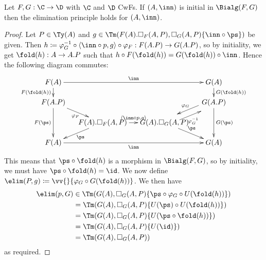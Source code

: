 \documentclass{article}
\begin{document}
\begin{theorem}
  Let $F, G : \C \to \D$ with $\C$ and $\D$ CwFs. If $(A, \inn)$ is
  initial in $\Bialg(F, G)$ then the elimination principle holds for
  $(A, \inn)$.
\end{theorem}
\begin{proof}
  Let $P \in \Ty(A)$ and $g \in \Tm(F(A).\square_F(A, P), \square_G(A,
  P)\{\inn \circ \ps\})$ be given. Then $h \coloneqq \varphi_G^{-1}
  \circ \langle \inn \circ p, g\rangle \circ \varphi_F : F(A.P) \to
  G(A.P)$, so by initiality, we get $\fold(h) : A \to A.P$ such that
  $h \circ F(\fold(h)) = G(\fold(h)) \circ \inn$. Hence the following
  diagram commutes:
\[
\xymatrix@-1pc{
F(A) \ar^-{\inn}[rrr] \ar_-{F(\fold(h))}[d] & & & G(A) \ar^-{G(\fold(h))}[d] \\
F(A.P) \ar_{\varphi_F}[dr] \ar_-{F(\ps)}[dd] & & & G(A.P) \ar@<-1ex>_-{\varphi_G}[dl] \ar^-{G(\ps)}[dd]\\
 & F(A).\square_F(A,P) \ar^{\langle \inn \circ p, g\rangle}[r] \ar^{\ps}[dl]& G(A).\square_G(A,P) \ar@<-1ex>_-{\varphi_G^{-1}}[ur] \ar^{\ps}[dr] & \\
F(A) \ar_-{\inn}[rrr] & & & G(A)
}
\]
This means that $\ps \circ \fold(h)$ is a morphism in $\Bialg(F, G)$,
so by initiality, we must have $\ps \circ \fold(h) = \id$. We now
define $\elim(P, g) \coloneqq \vv{}\{\varphi_G \circ G(\fold(h))\}$.
We then have
\begin{align*}
  \elim(p, G) &\in \Tm(G(A), \square_G(A, P)\{ \ps \circ \varphi_G \circ U(\fold(h))\}) \\
              &=  \Tm(G(A), \square_G(A, P)\{ U(\ps) \circ U(\fold(h))\}) \\
              &=  \Tm(G(A), \square_G(A, P)\{ U(\ps \circ \fold(h))\}) \\
              &=  \Tm(G(A), \square_G(A, P)\{ U(\id)\}) \\
              &=  \Tm(G(A), \square_G(A, P))
\end{align*}
as required.


\end{proof}
\end{document}
